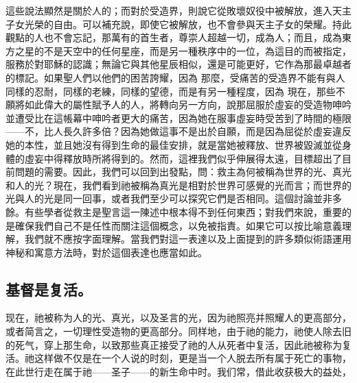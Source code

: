 這些說法顯然是關於人的；而對於受造界，則說它從敗壞奴役中被解放，進入天主子女光榮的自由。可以補充說，即使它被解放，也不會參與天主子女的榮耀。持此觀點的人也不會忘記，那萬有的首生者，尊崇人超越一切，成為人；而且，成為東方之星的不是天空中的任何星座，而是另一種秩序中的一位，為這目的而被指定，服務於對耶穌的認識；無論它與其他星辰相似，還是可能更好，它作為那最卓越者的標記。如果聖人們以他們的困苦誇耀，因為  那麼，受痛苦的受造界不能有與人同樣的忍耐，同樣的老練，同樣的望德，而是有另一種程度，因為  現在，那些不願將如此偉大的屬性賦予人的人，將轉向另一方向，說那屈服於虛妄的受造物呻吟並遭受比在這帳幕中呻吟者更大的痛苦，因為她在服事虛妄時受苦到了時間的極限——不，比人長久許多倍？因為她做這事不是出於自願，而是因為屈從於虛妄違反她的本性，並且她沒有得到生命的最佳安排，就是當她被釋放、世界被毀滅並從身體的虛妄中得釋放時所將得到的。然而，這裡我們似乎伸展得太遠，目標超出了目前問題的需要。因此，我們可以回到出發點，問：救主為何被稱為世界的光、真光和人的光？現在，我們看到祂被稱為真光是相對於世界可感覺的光而言；而世界的光與人的光是同一回事，或者我們至少可以探究它們是否相同。這個討論並非多餘。有些學者從救主是聖言這一陳述中根本得不到任何東西；對我們來說，重要的是確保我們自己不是任性而關注這個概念，以免被指責。如果它可以按比喻意義理解，我們就不應按字面理解。當我們對這一表達以及上面提到的許多類似術語運用神秘和寓意方法時，對於這個表達也應當如此。\par


\subsection{基督是复活。}

现在，祂被称为人的光、真光，以及圣言的光，因为祂照亮并照耀人的更高部分，或者简言之，一切理性受造物的更高部分。同样地，由于祂的能力，祂使人除去旧的死气，穿上那生命，以致那些真正接受了祂的人从死者中复活，因此祂被称为复活。祂这样做不仅是在一个人说的时刻，更是当一个人脱去所有属于死亡的事物，在此世行走在属于祂——圣子——的新生命中时。我们常，借此收获极大的益处，\par


